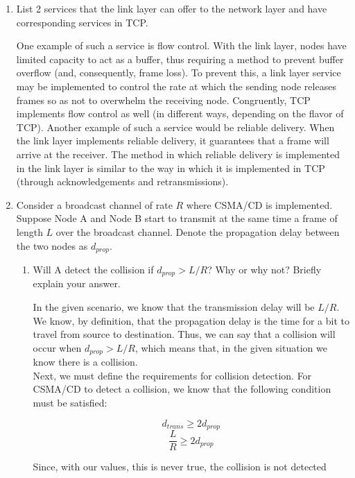 \begin{enumerate}

    \item List 2 services that the link layer can offer to the network layer and have corresponding services in TCP.

      One example of such a service is flow control. With the link layer, nodes have limited capacity to act as a buffer, thus requiring a method to prevent buffer overflow (and, consequently, frame loss). To prevent this, a link layer service may be implemented to control the rate at which the sending node releases frames so as not to overwhelm the receiving node. Congruently, TCP implements flow control as well (in different ways, depending on the flavor of TCP). Another example of such a service would be reliable delivery. When the link layer implements reliable delivery, it guarantees that a frame will arrive at the receiver. The method in which reliable delivery is implemented in the link layer is similar to the way in which it is implemented in TCP (through acknowledgements and retransmissions).

    \item Consider a broadcast channel of rate $R$ where CSMA/CD is implemented. Suppose Node A and Node B start to transmit at the same time a frame of length $L$ over the broadcast channel. Denote the propagation delay between the two nodes as $d_{prop}$.

      \begin{enumerate}

        \item Will A detect the collision if $d_{prop}>L/R$? Why or why not? Briefly explain your answer.

          In the given scenario, we know that the transmission delay will be $L/R$. We know, by definition, that the propagation delay is the time for a bit to travel from source to destination. Thus, we can say that a collision will occur when $d_{prop}>L/R$, which means that, in the given situation we know there is a collision.\\

          Next, we must define the requirements for collision detection. For CSMA/CD to detect a collision, we know that the following condition must be satisfied:

          $$d_{trans}\geq 2d_{prop}$$
          $$\frac{L}{R}\geq 2d_{prop}$$

          Since, with our values, this is never true, the collision is not detected


\end{enumerate}
\end{enumerate}
